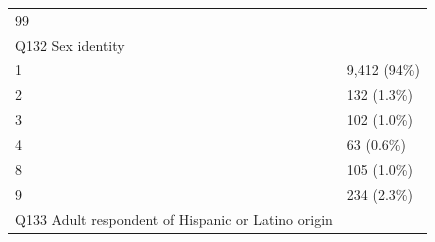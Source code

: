 \documentclass[]{article}
\begin{document}
\begin{longtable}[]{@{}ll@{}}
\begin{minipage}[t]{0.23\columnwidth}
99\strut
\end{minipage}\tabularnewline
\begin{minipage}[t]{0.71\columnwidth}\raggedright
Q132 Sex identity\strut
\end{minipage} & \begin{minipage}[t]{0.23\columnwidth}\raggedright
\strut
\end{minipage}\tabularnewline
\begin{minipage}[t]{0.71\columnwidth}\raggedright
1\strut
\end{minipage} & \begin{minipage}[t]{0.23\columnwidth}\raggedright
9,412 (94\%)\strut
\end{minipage}\tabularnewline
\begin{minipage}[t]{0.71\columnwidth}\raggedright
2\strut
\end{minipage} & \begin{minipage}[t]{0.23\columnwidth}\raggedright
132 (1.3\%)\strut
\end{minipage}\tabularnewline
\begin{minipage}[t]{0.71\columnwidth}\raggedright
3\strut
\end{minipage} & \begin{minipage}[t]{0.23\columnwidth}\raggedright
102 (1.0\%)\strut
\end{minipage}\tabularnewline
\begin{minipage}[t]{0.71\columnwidth}\raggedright
4\strut
\end{minipage} & \begin{minipage}[t]{0.23\columnwidth}\raggedright
63 (0.6\%)\strut
\end{minipage}\tabularnewline
\begin{minipage}[t]{0.71\columnwidth}\raggedright
8\strut
\end{minipage} & \begin{minipage}[t]{0.23\columnwidth}\raggedright
105 (1.0\%)\strut
\end{minipage}\tabularnewline
\begin{minipage}[t]{0.71\columnwidth}\raggedright
9\strut
\end{minipage} & \begin{minipage}[t]{0.23\columnwidth}\raggedright
234 (2.3\%)\strut
\end{minipage}\tabularnewline
\begin{minipage}[t]{0.71\columnwidth}\raggedright
Q133 Adult respondent of Hispanic or Latino origin\strut
\end{minipage} & \begin{minipage}[t]{0.23\columnwidth}\raggedright

\end{minipage}
\end{longtable}
\end{document}
